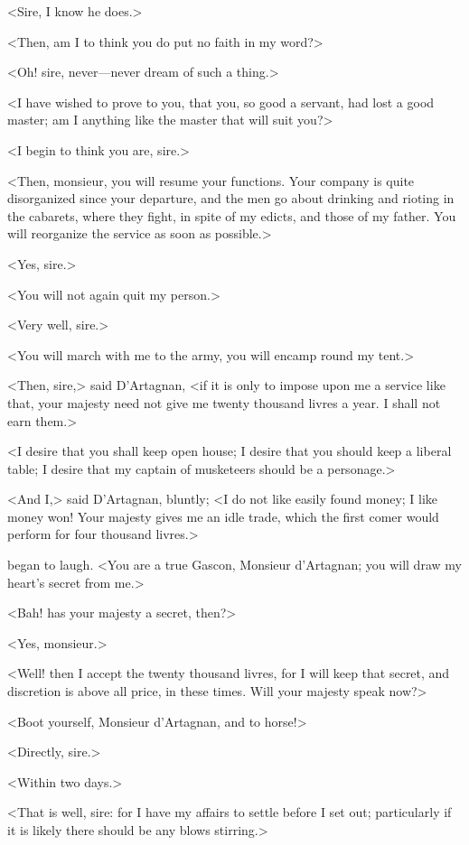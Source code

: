 <Sire, I know he does.>

<Then, am I to think you do put no faith in my word?>

<Oh! sire, never—never dream of such a thing.>

<I have wished to prove to you, that you, so good a servant, had lost a good master; am I anything like the master that will suit you?>

<I begin to think you are, sire.>

<Then, monsieur, you will resume your functions. Your company is quite disorganized since your departure, and the men go about drinking and rioting in the cabarets, where they fight, in spite of my edicts, and those of my father. You will reorganize the service as soon as possible.>

<Yes, sire.>

<You will not again quit my person.>

<Very well, sire.>

<You will march with me to the army, you will encamp round my tent.>

<Then, sire,> said D'Artagnan, <if it is only to impose upon me a service like that, your majesty need not give me twenty thousand livres a year. I shall not earn them.>

<I desire that you shall keep open house; I desire that you should keep a liberal table; I desire that my captain of musketeers should be a personage.>

<And I,> said D'Artagnan, bluntly; <I do not like easily found money; I like money won! Your majesty gives me an idle trade, which the first comer would perform for four thousand livres.>

 began to laugh. <You are a true Gascon, Monsieur d'Artagnan; you will draw my heart's secret from me.>

<Bah! has your majesty a secret, then?>

<Yes, monsieur.>

<Well! then I accept the twenty thousand livres, for I will keep that secret, and discretion is above all price, in these times. Will your majesty speak now?>

<Boot yourself, Monsieur d'Artagnan, and to horse!>

<Directly, sire.>

<Within two days.>

<That is well, sire: for I have my affairs to settle before I set out; particularly if it is likely there should be any blows stirring.>

